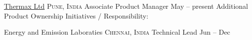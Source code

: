 \documentclass[10pt,a4paper]{article}
\begin{document}
\vspace{-1.25em}
\begin{multicols}{3}
	\begin{flushleft}
		
	\end{flushleft}
\end{multicols}
\spacedhrule{-0.1em}{-0.4em}



\headedsection  %
{\href{https://www.thermaxglobal.com/}{Thermax Ltd}}
{\textsc{Pune, India}} {%
	\headedsubsection
	{Associate Product Manager}
	{May  -- present}
	{
	}
	\headedsubsection
	{Additional Product Ownership Initiatives / Responsibility:}
	{}
	{
	}
}

\headedsection  %
{Energy and Emission Laboraties}
{\textsc{Chennai, India}} {%
	\headedsubsection
	{Technical Lead}
	{Jun  -- Dec }
	{\bodytext{}}
}

\vspace{1em}
\spacedhrule{-0.2em}{-0.4em}

\end{document}
